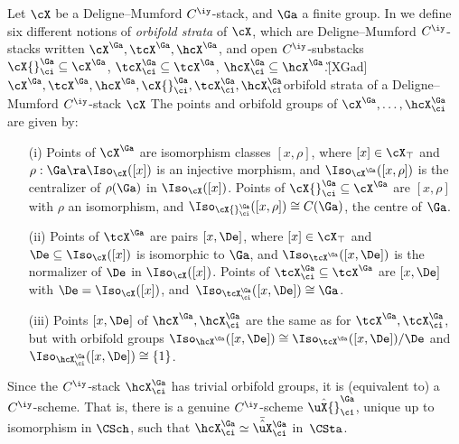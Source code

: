 \documentclass{article}
\begin{document}
Let $\cX$ be a Deligne--Mumford $C^\iy$-stack, and $\Ga$ a finite
group. In \cite[\S 11.1]{Joyc4} we define six different notions of
{\it orbifold strata\/} of $\cX$, which are Deligne--Mumford
$C^\iy$-stacks written $\cX^\Ga,\tcX^\Ga,\hcX^\Ga$, and open
$C^\iy$-substacks $\cX{}^\Ga_\ci\subseteq\cX^\Ga$,
$\tcX^\Ga_\ci\subseteq\tcX^\Ga$, $\hcX^\Ga_\ci\subseteq
\hcX^\Ga$.\G[XGad]{$\cX^\Ga,\tcX^\Ga,\hcX^\Ga,
\cX{}^\Ga_\ci,\tcX^\Ga_\ci,\hcX^\Ga_\ci$}{orbifold strata of a
Deligne--Mumford $C^\iy$-stack $\cX$} The points and orbifold
groups of
$\cX^\Ga,\ldots,\hcX^\Ga_\ci$ are given by:
\begin{itemize}
\setlength{\itemsep}{0pt}
\setlength{\parsep}{0pt}
\item[(i)] Points of $\cX^\Ga$ are isomorphism classes
$[x,\rho]$, where $[x]\in\cX_\top$ and
$\rho:\Ga\ra\Iso_\cX([x])$ is an injective morphism, and
$\Iso_{\smash{\cX^\Ga}}([x,\rho])$ is the centralizer of
$\rho(\Ga)$ in $\Iso_\cX([x])$. Points of
$\cX{}^\Ga_\ci\subseteq\cX^\Ga$ are $[x,\rho]$ with $\rho$ an
isomorphism, and $\Iso_{\smash{ \cX{}^\Ga_\ci}}([x,\rho])\cong
C(\Ga)$, the centre of $\Ga$.
\item[(ii)] Points of $\tcX^\Ga$ are pairs $[x,\De]$, where
$[x]\in\cX_\top$ and $\De\subseteq\Iso_\cX([x])$ is isomorphic
to $\Ga$, and $\Iso_{\smash{\tcX^\Ga}}([x,\De])$ is the
normalizer of $\De$ in $\Iso_\cX([x])$. Points of
$\tcX^\Ga_\ci\subseteq\tcX^\Ga$ are $[x,\De]$ with
$\De=\Iso_\cX([x])$, and~$\Iso_{\smash{\tcX^\Ga_\ci}}
([x,\De])\cong\Ga$.
\item[(iii)] Points $[x,\De]$ of $\hcX^\Ga,\hcX^\Ga_\ci$
are the same as for $\tcX^\Ga,\tcX^\Ga_\ci$, but with orbifold
groups $\Iso_{\smash{\hcX^\Ga}}([x,\De])\cong
\Iso_{\smash{\tcX^\Ga}}([x,\De])/\De$
and~$\Iso_{\smash{\hcX^\Ga_\ci}}([x,\De])\cong\{1\}$.
\end{itemize}
Since the $C^\iy$-stack $\hcX^\Ga_\ci$ has trivial orbifold groups,
it is (equivalent to) a $C^\iy$-scheme. That is, there is a genuine
$C^\iy$-scheme $\hat\uX{}^\Ga_\ci$, unique up to isomorphism in
$\CSch$, such that $\hcX^\Ga_\ci\simeq \bar{\hat\uX}{}^\Ga_\ci$
in~$\CSta$.
\end{document}
